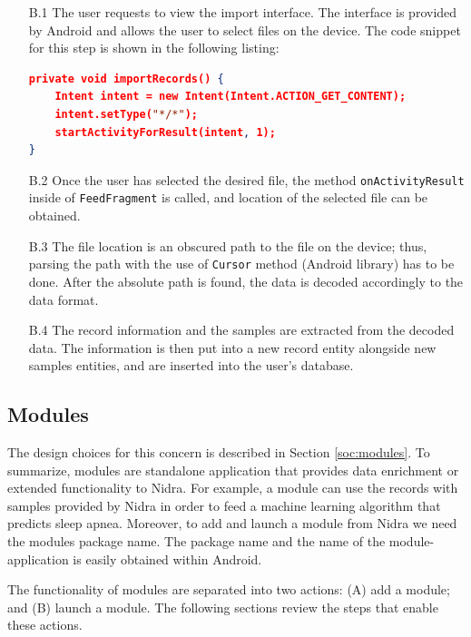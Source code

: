 \begin{itemize}
    \item[B.1] The user requests to view the import interface. The interface is provided by Android and allows the user to select files on the device. The code snippet for this step is shown in the following listing:
\begin{lstlisting}[language=json, caption={}, captionpos=b]
private void importRecords() {
    Intent intent = new Intent(Intent.ACTION_GET_CONTENT);
    intent.setType("*/*");
    startActivityForResult(intent, 1);
}

\end{lstlisting}
    \item[B.2] Once the user has selected the desired file, the method \verb|onActivityResult| inside of \verb|FeedFragment| is called, and location of the selected file can be obtained. 
    \item[B.3] The file location is an obscured path to the file on the device; thus, parsing the path with the use of \verb|Cursor| method (Android library) has to be done. After the absolute path is found, the data is decoded accordingly to the data format.
    \item[B.4] The record information and the samples are extracted from the decoded data. The information is then put into a new record entity alongside new samples entities, and are inserted into the user's database. 
\end{itemize}

\subsection{Modules}
The design choices for this concern is described in Section \ref{soc:modules}. To summarize, modules are standalone application that provides data enrichment or extended functionality to Nidra. For example, a module can use the records with samples provided by Nidra in order to feed a machine learning algorithm that predicts sleep apnea. Moreover, to add and launch a module from Nidra we need the modules package name. The package name and the name of the module-application is easily obtained within Android. 

The functionality of modules are separated into two actions: (A) add a module; and (B) launch a module.  The following sections review the steps that enable these actions. 

